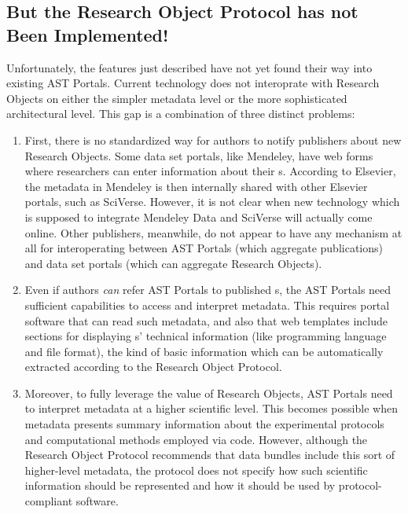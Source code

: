 \documentclass[10pt,letterpaper]{article}
\begin{document}
\subsection{But the Research Object Protocol has not Been Implemented!}
Unfortunately, the {\RO} features just described 
have not yet found their way into existing AST  
Portals.  Current technology does not 
interoprate with Research Objects on either 
the simpler metadata level or the more sophisticated 
architectural level.  This gap is a combination 
of three distinct problems:
\p{}
\begin{enumerate}
\item First, there is no standardized way for authors 
to notify publishers about new Research Objects.  
Some data set portals, like Mendeley, have 
web forms where researchers can enter information 
about their {\RO}s.  According to Elsevier, 
the metadata in Mendeley is then internally shared 
with other Elsevier portals, such as SciVerse.  
However, it is not clear when new technology 
which is supposed to integrate Mendeley Data and 
SciVerse will actually come online.  
Other publishers, meanwhile, do not appear to have 
any mechanism at all for interoperating between 
AST Portals (which aggregate publications) and 
data set portals (which can aggregate Research Objects).

\item Even if authors \textit{can} refer AST Portals 
to published {\RO}s, the AST Portals 
need sufficient capabilities to access and 
interpret {\RO} metadata.  This 
requires portal software that can read such metadata, 
and also that web templates include sections for 
displaying {\RO}s' technical information 
(like programming language and file format), 
the kind of basic information which can be automatically 
extracted according to the Research Object Protocol.

\item Moreover, to fully leverage the value 
of Research Objects, AST Portals need to interpret 
{\RO} metadata at a higher scientific level.  
This becomes possible when {\RO} metadata 
presents summary information about the 
experimental protocols and computational 
methods employed via {\RO} code.  
However, although the Research Object Protocol 
recommends that data bundles include 
this sort of higher-level metadata, 
the protocol does not specify how 
such scientific information should 
be represented and how it should be used 
by protocol-compliant software.  
\end{enumerate} 
 
\end{document}
